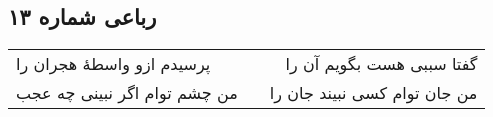 \begin{center}
\section*{رباعی شماره ۱۳}
\label{sec:sh013}
\begin{longtable}{l p{0.5cm} r}
پرسیدم ازو واسطهٔ هجران را
&&
گفتا سببی هست بگویم آن را
\\
من چشم توام اگر نبینی چه عجب
&&
من جان توام کسی نبیند جان را
\\
\end{longtable}
\end{center}
